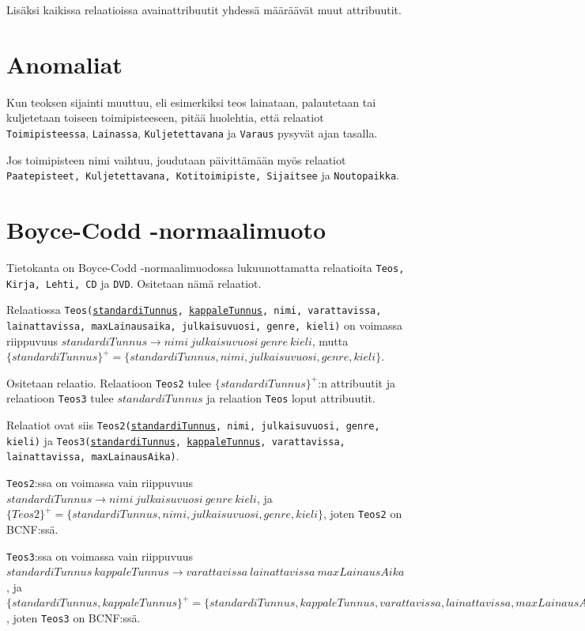 \documentclass[12pt,titlepage] {article}
\begin{document}
Lisäksi kaikissa relaatioissa avainattribuutit yhdessä määräävät muut attribuutit.

\section {Anomaliat}

Kun teoksen sijainti muuttuu, eli esimerkiksi teos lainataan, palautetaan tai kuljetetaan toiseen toimipisteeseen, pitää huolehtia, että relaatiot \texttt{Toimipisteessa}, \texttt{Lainassa}, \texttt{Kuljetettavana} ja \texttt{Varaus} pysyvät ajan tasalla.

Jos toimipisteen nimi vaihtuu, joudutaan päivittämään myös relaatiot \texttt{Paatepisteet, Kuljetettavana, Kotitoimipiste, Sijaitsee} ja \texttt{Noutopaikka}.

\section {Boyce-Codd -normaalimuoto}

Tietokanta on Boyce-Codd -normaalimuodossa lukuunottamatta relaatioita \texttt{Teos, Kirja, Lehti, CD} ja \texttt{DVD}. Ositetaan nämä relaatiot.

Relaatiossa \texttt{Teos(\underline{standardiTunnus}, \underline{kappaleTunnus}, nimi, varattavissa, lainattavissa, maxLainausaika, julkaisuvuosi, genre, kieli)} on voimassa riippuvuus $standardiTunnus \rightarrow nimi\ julkaisuvuosi\ genre\ kieli$, mutta $\{standardiTunnus\}^+ = \{standardiTunnus, nimi, julkaisuvuosi, genre, kieli\}$.

Ositetaan relaatio. Relaatioon \texttt{Teos2} tulee $\{standardiTunnus\}^+$:n attribuutit ja relaatioon \texttt{Teos3} tulee $standardiTunnus$ ja relaation \texttt{Teos} loput attribuutit.

Relaatiot ovat siis \texttt{Teos2(\underline{standardiTunnus}, nimi, julkaisuvuosi, genre, kieli)} ja \texttt{Teos3(\underline{standardiTunnus}, \underline{kappaleTunnus}, varattavissa, lainattavissa, maxLainausAika)}.

\texttt{Teos2}:ssa on voimassa vain riippuvuus $standardiTunnus \rightarrow nimi\ julkaisuvuosi\ genre\ kieli$, ja $\{Teos2\}^+ = \{standardiTunnus, nimi, julkaisuvuosi, genre, kieli\}$, joten \texttt{Teos2} on BCNF:ssä. 

\texttt{Teos3}:ssa on voimassa vain riippuvuus $standardiTunnus\ kappaleTunnus \rightarrow varattavissa\ lainattavissa\ maxLainausAika$, ja $\{standardiTunnus, kappaleTunnus\}^+ = \{standardiTunnus, kappaleTunnus, varattavissa, lainattavissa, maxLainausAika\}$, joten \texttt{Teos3} on BCNF:ssä.
\end{document}
